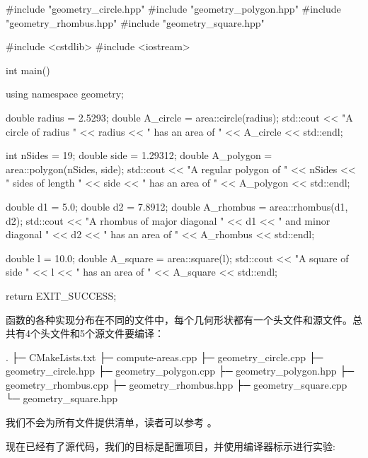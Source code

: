 \begin{codebox}[cpp]
#include "geometry_circle.hpp"
#include "geometry_polygon.hpp"
#include "geometry_rhombus.hpp"
#include "geometry_square.hpp"

#include <cstdlib>
#include <iostream>

int main() {
  using namespace geometry;
  
  double radius = 2.5293;
  double A_circle = area::circle(radius);
  std::cout << "A circle of radius " << radius << " has an area of " << A_circle
            << std::endl;
  
  int nSides = 19;
  double side = 1.29312;
  double A_polygon = area::polygon(nSides, side);
  std::cout << "A regular polygon of " << nSides << " sides of length " << side
            << " has an area of " << A_polygon << std::endl;

  double d1 = 5.0;
  double d2 = 7.8912;
  double A_rhombus = area::rhombus(d1, d2);
  std::cout << "A rhombus of major diagonal " << d1 << " and minor diagonal " << d2
            << " has an area of " << A_rhombus << std::endl;
  
  double l = 10.0;
  double A_square = area::square(l);
  std::cout << "A square of side " << l << " has an area of " << A_square
  << std::endl;

  return EXIT_SUCCESS;
}
\end{codebox}

函数的各种实现分布在不同的文件中，每个几何形状都有一个头文件和源文件。总共有4个头文件和5个源文件要编译：

\begin{codebox}[shell]
.
├─ CMakeLists.txt
├─ compute-areas.cpp
├─ geometry_circle.cpp
├─ geometry_circle.hpp
├─ geometry_polygon.cpp
├─ geometry_polygon.hpp
├─ geometry_rhombus.cpp
├─ geometry_rhombus.hpp
├─ geometry_square.cpp
└─ geometry_square.hpp
\end{codebox}

我们不会为所有文件提供清单，读者可以参考  。


现在已经有了源代码，我们的目标是配置项目，并使用编译器标示进行实验:

